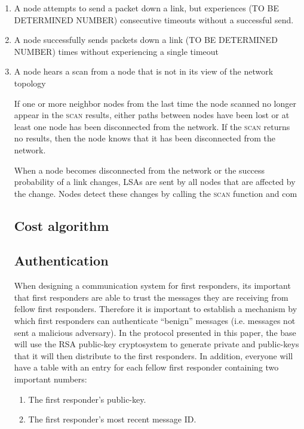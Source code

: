 \documentclass[letterpaper]{article}
\begin{document}
\begin{enumerate}
  \item A node attempts to send a packet down a link, but experiences (TO BE DETERMINED NUMBER) 
  consecutive timeouts without a successful send.
  \item A node successfully sends packets down a link (TO BE DETERMINED NUMBER) times without
  experiencing a single timeout
  \item A node hears a scan from a node that is not in its view of the network topology

\noindent If one or more neighbor nodes from the last time the node scanned no longer appear in 
the \textsc{scan} results, either paths between nodes have been lost or at least one node has
been disconnected from the network. If the \textsc{scan} returns no results, then the node knows
that it has been disconnected from the network. 

\noindent When a node becomes disconnected from the network or the success probability of a link changes,
LSAs are sent by all nodes that are affected by the change. Nodes detect these changes by calling
the \textsc{scan} function and com

\subsection{Cost algorithm}

\subsection{Authentication}
When designing a communication system for first responders, its important that first responders are able to trust the messages they are receiving from fellow first responders. Therefore it is important to establish a mechanism by which first responders can authenticate “benign” messages (i.e. messages not sent a malicious adversary). In the protocol presented in this paper, the base will use the RSA public-key cryptosystem to generate private and public-keys that it will then distribute to the first responders. In addition, everyone will have a table with an entry for each fellow first responder containing two important numbers:

\begin{enumerate}
  \item The first responder's public-key. 
  \item The first responder's most recent message ID.
\end{enumerate}


\end{enumerate}
\end{document}
